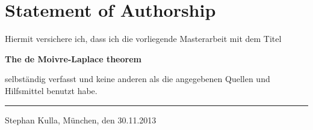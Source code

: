 \cleardoublepage
{} \label{statement_of_authorship}

\chapter*{Statement of Authorship}

Hiermit versichere ich, dass ich die vorliegende Masterarbeit mit dem Titel

\begin{center}
\textbf{The de Moivre-Laplace theorem}
\end{center}

\noindent selbständig verfasst und keine anderen als die angegebenen Quellen und Hilfsmittel benutzt habe.

\vspace*{2cm}

\noindent\rule{0.3\textwidth}{0.4pt}

\noindent Stephan Kulla, \newline 
München, den 30.11.2013

